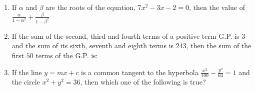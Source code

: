 \documentclass[journal,12pt,onecolumn]{IEEEtran}
\theoremstyle{remark}
\begin{document}
\begin{enumerate}
      \begin{enumerate}
      \end{enumerate}
      \item If $\alpha$ and $\beta$ are the roots of the equation, $7x^{2}-3x-2=0$, then the value of$\frac{\alpha}{1-\alpha^{2}} +\frac{\beta}{1-\beta^{2}}$
      \begin{enumerate}
      \end{enumerate}
      \item If the sum of the second, third and fourth terms of a positive term G.P. is $3$ and the sum of its sixth, seventh and eighth terms is $243$, then the sum of the first $50$ terms of the G.P. is:
       \begin{enumerate}
      \end{enumerate}
     \item If the line $y=mx+c$ is a common tangent to the hyperbola $\frac{x^{2}}{100} - \frac{y^{2}}{64}=1$ and the circle $x^{2}+y^{2}=36$, then which one of the following is true?
      \begin{enumerate}
\end{enumerate}
\end{enumerate}
\end{document}
